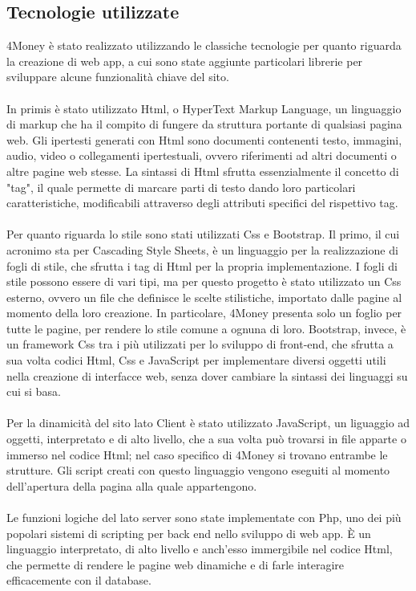 \documentclass[binding=0.6cm, oneside, noexaminfo, italian]{sapthesis}
\begin{document}
\subsection{Tecnologie utilizzate}
4Money è stato realizzato utilizzando le classiche tecnologie per quanto riguarda la creazione di web app, a cui sono state aggiunte particolari librerie per sviluppare alcune funzionalità chiave del sito. \\ \\
In primis è stato utilizzato Html, o HyperText Markup Language, un linguaggio di markup che ha il compito di fungere da struttura portante di qualsiasi pagina web. Gli ipertesti generati con Html sono documenti contenenti testo, immagini, audio, video o collegamenti ipertestuali, ovvero riferimenti ad altri documenti o altre pagine web stesse. La sintassi di Html sfrutta essenzialmente il concetto di "tag", il quale permette di marcare parti di testo dando loro particolari caratteristiche, modificabili attraverso degli attributi specifici del rispettivo tag. \cite{Slides}\\ \\
Per quanto riguarda lo stile sono stati utilizzati Css e Bootstrap. Il primo, il cui acronimo sta per Cascading Style Sheets, è un linguaggio per la realizzazione di fogli di stile, che sfrutta i tag di Html per la propria implementazione. I fogli di stile possono essere di vari tipi, ma per questo progetto è stato utilizzato un Css esterno, ovvero un file che definisce le scelte stilistiche, importato dalle pagine al momento della loro creazione. In particolare, 4Money presenta solo un foglio per tutte le pagine, per rendere lo stile comune a ognuna di loro. Bootstrap, invece, è un framework Css tra i più utilizzati per lo sviluppo di front-end, che sfrutta a sua volta codici Html, Css e JavaScript per implementare diversi oggetti utili nella creazione di interfacce web, senza dover cambiare la sintassi dei linguaggi su cui si basa. \cite{Bootstrap} \\ \\
Per la dinamicità del sito lato Client è stato utilizzato JavaScript, un liguaggio ad oggetti, interpretato e di alto livello, che a sua volta può trovarsi in file apparte o immerso nel codice Html; nel caso specifico di 4Money si trovano entrambe le strutture. Gli script creati con questo linguaggio vengono eseguiti al momento dell'apertura della pagina alla quale appartengono. \cite{Slides} \\ \\
Le funzioni logiche del lato server sono state implementate con Php, uno dei più popolari sistemi di scripting per back end nello sviluppo di web app. \MakeUppercase{è} un linguaggio interpretato, di alto livello e anch'esso immergibile nel codice Html, che permette di rendere le pagine web dinamiche e di farle interagire efficacemente con il database. \cite{Slides} \\ \\
\end{document}
